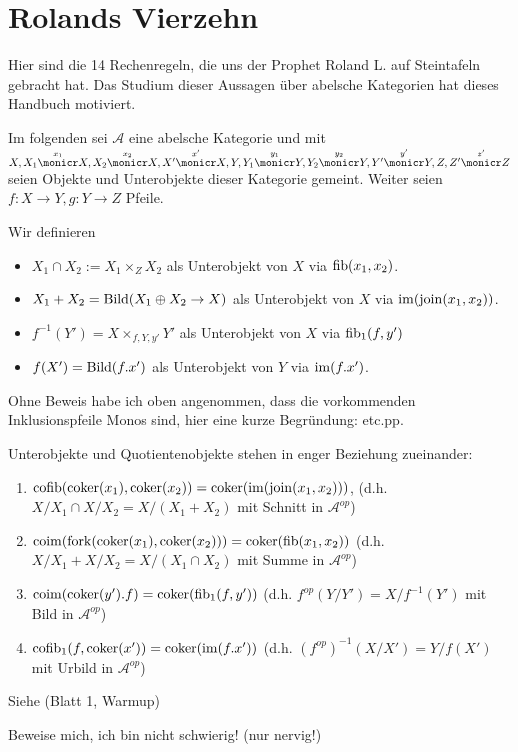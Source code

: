 \section{Rolands Vierzehn}

Hier sind die 14 Rechenregeln, die uns der Prophet Roland L. auf Steintafeln gebracht hat. Das Studium dieser Aussagen über abelsche Kategorien hat dieses Handbuch motiviert.

Im folgenden sei $\mathcal A$ eine abelsche Kategorie und mit $X,
X_1 \overset{x_1}\monicr X,
X_2 \overset{x_2}\monicr X,
X'  \overset{x'}\monicr X,
Y,
Y_1 \overset{y_1}\monicr Y,
Y_2 \overset{y_2}\monicr Y,
Y'  \overset{y'}\monicr Y,
Z,
Z'  \overset{z'}\monicr Z$
seien Objekte und Unterobjekte dieser Kategorie gemeint.
Weiter seien $f:X\to Y, g:Y\to Z$ Pfeile.

\begin{defn}[Objektnotation]
Wir definieren
\begin{itemize}
\item $X_1 \cap X_2 := X_1\times_Z X_2$ als Unterobjekt von $X$ via $\operatorname{fib}(x_1, x_2)$.
\item $X_1+X_2 = \operatorname{Bild}(X_1 \oplus X_2 \to X)$ als Unterobjekt von $X$ via $\operatorname{im}(\operatorname{join}(x_1,x_2))$.
\item $f^{-1}(Y') = X \times_{f,Y,y'} Y'$ als Unterobjekt von $X$ via $\operatorname{fib}_1(f,y')$
\item $f(X') = \operatorname{Bild}(f.x')$ als Unterobjekt von $Y$ via $\operatorname{im}(f.x')$.
\end{itemize}
\end{defn}

\begin{bem}
Ohne Beweis habe ich oben angenommen, dass die vorkommenden Inklusionspfeile Monos sind, hier eine kurze Begründung: etc.pp. %
\end{bem}

\begin{prop}[Reflexionsprinzip]
Unterobjekte und Quotientenobjekte stehen in enger Beziehung zueinander:
\begin{enumerate}
\item $\operatorname{cofib}(\operatorname{coker}(x_1), \operatorname{coker}(x_2)) = \operatorname{coker}(\operatorname{im}(\operatorname{join}(x_1,x_2)))$, (d.h. $X/X_1 \cap X/X_2 = X/(X_1+X_2)$ mit Schnitt in $\mathcal A^{op}$)
\item $\operatorname{coim}(\operatorname{fork}(\operatorname{coker}(x_1),\operatorname{coker}(x_2))) = \operatorname{coker}(\operatorname{fib}(x_1,x_2))$ (d.h. $X/X_1 + X/X_2 = X/(X_1\cap X_2)$ mit Summe in $\mathcal A^{op}$)
\item $\operatorname{coim}(\operatorname{coker}(y').f) = \operatorname{coker}(\operatorname{fib}_1(f,y'))$ (d.h. $f^{op}(Y/Y') = X/f^{-1}(Y')$ mit Bild in $\mathcal A^{op}$)
\item $\operatorname{cofib}_1(f,\operatorname{coker}(x')) = \operatorname{coker}(\operatorname{im}(f.x'))$ (d.h. $(f^{op})^{-1}(X/X') = Y/f(X')$ mit Urbild in $\mathcal A^{op}$)
\end{enumerate}
Siehe (Blatt 1, Warmup)
\end{prop}
\begin{bew}
Beweise mich, ich bin nicht schwierig! (nur nervig!)
\end{bew}

